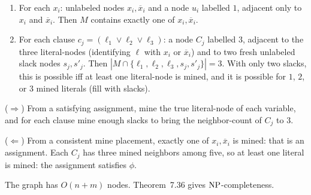 \begin{soln}
\begin{enumerate}
\item For each $x_i$: unlabeled nodes $x_i,\overline{x}_i$ and a node $u_i$ labelled $1$, adjacent only to $x_i$ and $\overline{x}_i$. Then $M$ contains exactly one of $x_i,\overline{x}_i$.
\item For each clause $c_j=(\ell_1\lor\ell_2\lor\ell_3)$: a node $C_j$ labelled $3$, adjacent to the three literal-nodes (identifying $\ell$ with $x_i$ or $\overline{x}_i$) and to two fresh unlabeled slack nodes $s_j,s'_j$. Then $|M\cap\{\ell_1,\ell_2,\ell_3,s_j,s'_j\}|=3$. With only two slacks, this is possible iff at least one literal-node is mined, and it is possible for $1$, $2$, or $3$ mined literals (fill with slacks).
\end{enumerate}

($\Rightarrow$) From a satisfying assignment, mine the true literal-node of each variable, and for each clause mine enough slacks to bring the neighbor-count of $C_j$ to $3$.

($\Leftarrow$) From a consistent mine placement, exactly one of $x_i,\overline{x}_i$ is mined: that is an assignment. Each $C_j$ has three mined neighbors among five, so at least one literal is mined: the assignment satisfies $\phi$.

The graph has $O(n+m)$ nodes. Theorem~7.36 gives $\mathrm{NP}$-completeness.
\end{soln}

